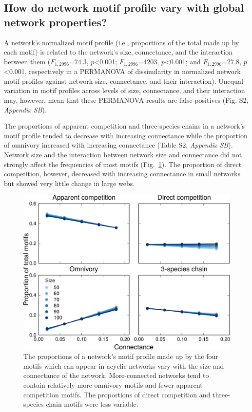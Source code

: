 \documentclass[12pt]{article}
\begin{document}
\begin{spacing}{2.0}
    \clearpage

    \subsection*{How do network motif profile vary with global network properties?}

        A network's normalized motif profile (i.e., proportions of the total made up by each motif)
        is related to the network's size, connectance, and the interaction between them ($F_{1,2996}$=74.3, $p$\textless0.001; $F_{1,2996}$=4203, $p$\textless0.001; and $F_{1,2996}$=27.8, $p$\textless0.001, respectively in a PERMANOVA of dissimilarity in normalized network motif profiles against network size, connectance, and their interaction).
        Unequal variation in motif profiles across levels of size, connectance, and their interaction may, however, mean that these PERMANOVA results are false positives (Fig. S2, \emph{Appendix SB}).
        
        The proportions of apparent competition and three-species chains in a network's motif profile tended to decrease with increasing connectance while the proportion of omnivory increased with increasing connectance (Table S2, \emph{Appendix SB}). 
        Network size and the interaction between network size and connectance did not strongly affect the frequencies of most motifs (Fig.~\ref{motif_proportion_lms}). The proportion of direct competition, however, decreased with increasing connectance in small networks but showed very little change in large webs.


        \begin{figure}[h!]
            \centering
            \includegraphics[width=.75\textwidth]{manuscript/figures/motif_proportion_lms.pdf}
            \caption{The proportions of a network's motif profile made up by the four motifs which can appear in acyclic networks vary with the size and connectance of the network. More-connected networks tend to contain relatively more omnivory motifs and fewer apparent competition motifs. The proportions of direct competition and three-species chain motifs were less variable.}
            \label{motif_proportion_lms}
        \end{figure}


\end{spacing}
\end{document}
